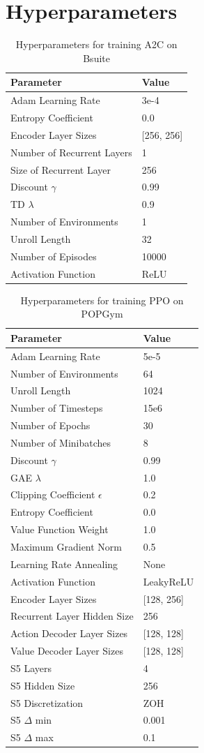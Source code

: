 \documentclass{article}
\begin{document}
\section{Hyperparameters}
\label{app:hyperparameters}
\begin{table}[h]
\centering
\caption{Hyperparameters for training A2C on Bsuite}
\label{tab:bsuite-params}
\begin{tabular}{l|l}
Parameter & Value \\ \hline
Adam Learning Rate & 3e-4 \\
Entropy Coefficient & 0.0 \\
Encoder Layer Sizes & [256, 256] \\
Number of Recurrent Layers & 1 \\
Size of Recurrent Layer & 256 \\
Discount $\gamma$ & 0.99 \\
TD $\lambda$ & 0.9 \\
Number of Environments & 1 \\
Unroll Length & 32 \\
Number of Episodes & 10000 \\
Activation Function & ReLU \\
\end{tabular}
\end{table}
\begin{table}[h]
\centering
\caption{Hyperparameters for training PPO on POPGym}
\label{tab:popgym-params}
\begin{tabular}{l|l}
Parameter & Value \\ \hline
Adam Learning Rate & 5e-5 \\
Number of Environments & 64 \\
Unroll Length & 1024 \\
Number of Timesteps & 15e6 \\
Number of Epochs & 30 \\
Number of Minibatches & 8 \\
Discount $\gamma$ & 0.99 \\
GAE $\lambda$ & 1.0 \\
Clipping Coefficient $\epsilon$ & 0.2 \\
Entropy Coefficient & 0.0 \\
Value Function Weight & 1.0 \\
Maximum Gradient Norm & 0.5 \\
Learning Rate Annealing & None \\
Activation Function & LeakyReLU \\
Encoder Layer Sizes & [128, 256] \\
Recurrent Layer Hidden Size & 256 \\
Action Decoder Layer Sizes & [128, 128] \\
Value Decoder Layer Sizes & [128, 128] \\
S5 Layers & 4 \\
S5 Hidden Size & 256 \\
S5 Discretization & ZOH \\
S5 $\Delta$ min & 0.001 \\
S5 $\Delta$ max & 0.1 \\
\end{tabular}
\end{table}
\end{document}
